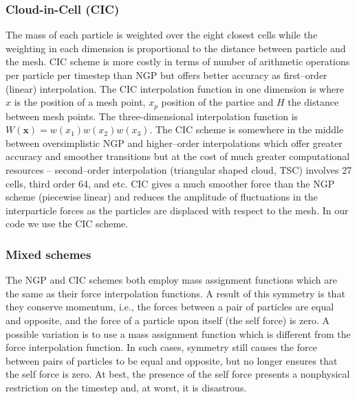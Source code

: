 \subsubsection{Cloud-in-Cell (CIC)}
The mass of each particle is weighted over the eight closest cells while the weighting in each dimension is proportional to the distance between particle and the mesh. CIC scheme is more costly in terms of number of arithmetic operations per particle per timestep than NGP but offers better accuracy as first--order (linear) interpolation. The CIC interpolation function in one dimension is
where $x$ is the position of a mesh point, $x_p$ position of the partice and $H$ the distance between mesh points. The three-dimensional interpolation function is \(W(\mathbf x)=w(x_1)w(x_2)w(x_3)\). The CIC scheme is somewhere in the middle between oversimplistic NGP and higher--order interpolations which offer greater accuracy and smoother transitions but at the cost of much greater computational resources -- second--order interpolation (triangular shaped cloud, TSC) involves 27 cells, third order 64, and etc. CIC gives a much smoother force than the NGP scheme (piecewise linear) and reduces the amplitude of fluctuations in the interparticle forces as the particles are displaced with respect to the mesh. In our code we use the CIC scheme.
\subsubsection{Mixed schemes}
The NGP and CIC schemes both employ mass assignment functions which are the same as their force interpolation functions. A result of this symmetry is that they conserve momentum, i.e., the forces between a pair of particles are equal and opposite, and the force of a particle upon itself (the self force) is zero. A possible variation is to use a mass assignment function which is different from the force interpolation function. In such cases, symmetry still causes the force between pairs of particles to be equal and opposite, but no longer ensures that the self force is zero. At best, the presence of the self force presents a nonphysical restriction on the timestep and, at worst, it is disastrous.


